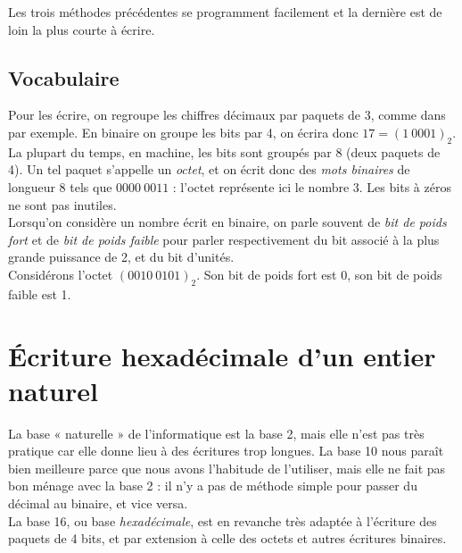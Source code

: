 Les trois méthodes précédentes se programment facilement et la dernière est de loin la plus courte à écrire.

\subsection{Vocabulaire}

\medskip\par
Pour les écrire, on regroupe les chiffres décimaux par paquets de 3, comme dans  par exemple.
En binaire on groupe les bits par 4, on écrira donc $17=\left(1\ 0001\right)_2$.\\
La plupart du temps, en machine, les bits sont groupés par 8 (deux paquets de 4). Un tel paquet s'appelle un \textit{octet}, et on écrit donc des \textit{mots binaires} de longueur 8 tels que $0000\ 0011$ : l'octet représente ici le nombre 3. Les bits à zéros ne sont pas inutiles.\\

Lorsqu'on considère un nombre écrit en binaire, on parle souvent de \textit{bit de poids fort} et de
\textit{bit de poids faible} pour parler respectivement du bit associé à la plus grande puissance de 2, et du bit
d'unités.\\
Considérons l'octet $(0010\ 0101)_2$. Son bit de poids fort est 0, son bit de poids faible est 1.

\section{\'Ecriture hexadécimale d'un entier naturel}

La base « naturelle »  de l'informatique est la base 2, mais elle n'est pas très pratique car elle donne lieu à
des écritures trop longues.
La base 10 nous paraît bien meilleure parce que nous avons l'habitude de l'utiliser, mais elle ne fait pas bon ménage
avec la base 2 : il n'y a pas de méthode simple pour passer du décimal au binaire, et vice versa.\\
La base 16, ou base \textit{hexadécimale}, est en revanche très adaptée à l'écriture des paquets de 4 bits, et par
extension à celle des octets et autres écritures binaires.\\


